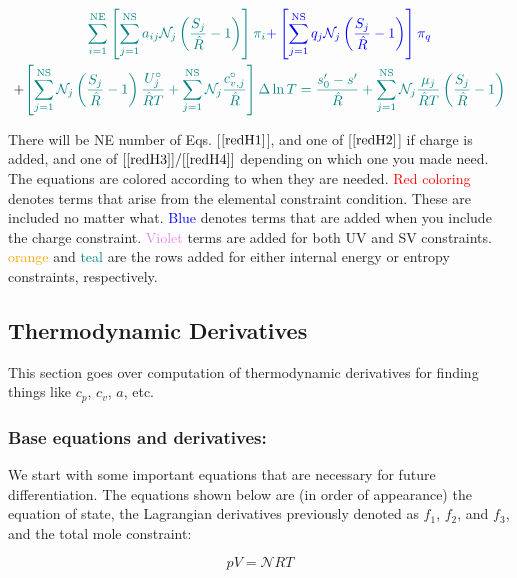 \documentclass[10pt]{article}
\begin{document}
\begin{flushleft}
\begin{multline}
    \textcolor{teal}{\sum_{i=1}^\text{NE} \left[ \sum_{j=1}^\text{NS} a_{ij} \mathcal{N}_j \left( \frac{S_j}{\hat{R}} - 1 \right) \right] \pi_i} \textcolor{blue}{ + \left[\sum_{j=1}^\text{NS} q_j \mathcal{N}_j \left( \frac{S_j}{\hat{R}} - 1\right) \right] \pi_q} 
    \\ + \textcolor{teal}{\left[\sum_{j=1}^\text{NS} \mathcal{N}_j \left( \frac{S_j}{\hat{R}} - 1 \right) \frac{U_j^\circ}{\hat{R}T} + \sum_{j=1}^\text{NS} \mathcal{N}_j \frac{c_{v,j}^\circ}{\hat{R}} \right] \Delta \ln T  = \frac{s_0' - s'}{\hat{R}} + \sum_{j=1}^\text{NS} \mathcal{N}_j \frac{\mu_j}{\hat{R}T} \left( \frac{S_j}{\hat{R}} - 1 \right)} 
    \label{redH4}
\end{multline}


There will be NE number of Eqs. [$\ref{redH1}$], and one of [$\ref{redH2}$] if charge is added, and one of $[\ref{redH3}]/[\ref{redH4}]$ depending on which one you made need.
\vspace{5mm}
\\ The equations are colored according to when they are needed. \textcolor{red}{Red coloring} denotes terms that arise from the elemental constraint condition. These are included no matter what. \textcolor{blue}{Blue} denotes terms that are added when you include the charge constraint. \textcolor{violet}{Violet} terms are added for both UV and SV constraints. \textcolor{orange}{orange} and \textcolor{teal}{teal} are the rows added for either internal energy or entropy constraints, respectively.

\subsection{Thermodynamic Derivatives}

This section goes over computation of thermodynamic derivatives for finding things like $c_p$, $c_v$, $a$, etc.

\subsubsection{Base equations and derivatives:}

We start with some important equations that are necessary for future differentiation. The equations shown below are (in order of appearance) the equation of state, the Lagrangian derivatives previously denoted as $f_1$, $f_2$, and $f_3$, and the total mole constraint:

\begin{equation}
    pV = \mathcal{N}RT \label{EOS}
\end{equation}


\end{flushleft}
\end{document}
